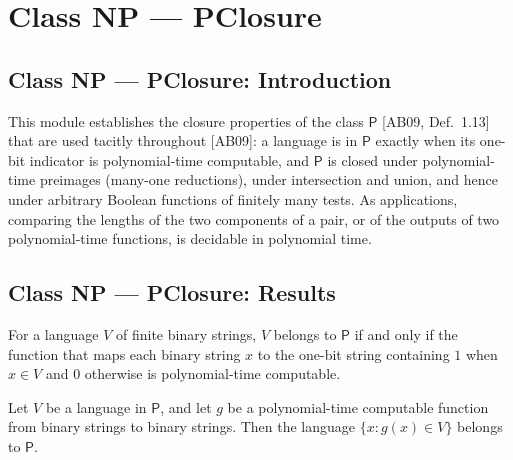 \section{Class NP --- PClosure}
\subsection*{Class NP --- PClosure: Introduction}

This module establishes the closure properties of the class $\mathsf{P}$ [AB09, Def.~1.13]
that are used tacitly throughout [AB09]: a language is in $\mathsf{P}$ exactly when its
one-bit indicator is polynomial-time computable, and $\mathsf{P}$ is closed under
polynomial-time preimages (many-one reductions), under intersection and union, and hence
under arbitrary Boolean functions of finitely many tests. As applications, comparing the
lengths of the two components of a pair, or of the outputs of two polynomial-time
functions, is decidable in polynomial time.

\subsection*{Class NP --- PClosure: Results}

\begin{theorem}
\label{Complexity.mem_P_iff_polyTimeComputable}
\leanok
{}
For a language $V$ of finite binary strings, $V$ belongs to $\mathsf{P}$ if and only if
the function that maps each binary string $x$ to the one-bit string containing $1$ when
$x\in V$ and $0$ otherwise is polynomial-time computable.
\end{theorem}

\begin{theorem}
\label{Complexity.preimage_mem_P}
\leanok
{}
Let $V$ be a language in $\mathsf{P}$, and let $g$ be a polynomial-time computable
function from binary strings to binary strings. Then the language $\{x:g(x)\in V\}$
belongs to $\mathsf{P}$.
\end{theorem}

